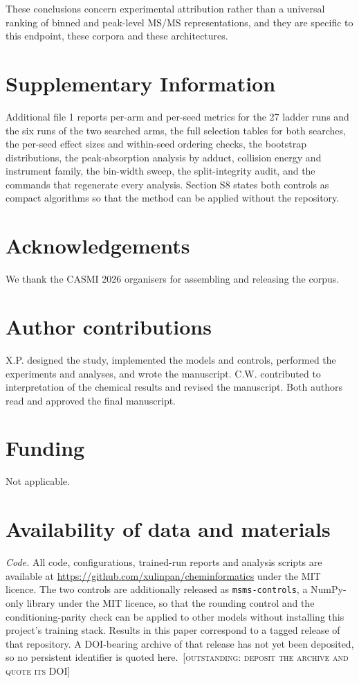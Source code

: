 \documentclass[11pt]{article}
\newif\ifdraftnotes\draftnotestrue
\newcommand{\todoarchive}{\ifdraftnotes\ \textcolor{ednotecol}{\small\textsc{[outstanding:
deposit the archive and quote its DOI]}}\fi}
\begin{document}
These conclusions concern experimental attribution rather than a universal ranking of
binned and peak-level MS/MS representations, and they are specific to this endpoint,
these corpora and these architectures.

\section*{Supplementary Information}
Additional file 1 reports per-arm and per-seed metrics for the 27 ladder runs and the six runs of the two searched arms, the full selection tables for both searches, the per-seed effect sizes and within-seed ordering checks, the bootstrap distributions, the peak-absorption analysis by adduct, collision energy and instrument family, the bin-width sweep, the split-integrity audit, and the commands that regenerate every analysis. Section S8 states both controls as compact algorithms so that the method can be applied without the repository.

\section*{Acknowledgements}
We thank the CASMI 2026 organisers for assembling and releasing the corpus.

\section*{Author contributions}
X.P. designed the study, implemented the models and controls, performed the experiments and analyses, and wrote the manuscript. C.W. contributed to interpretation of the chemical results and revised the manuscript. Both authors read and approved the final manuscript.

\section*{Funding}
Not applicable.

\section*{Availability of data and materials}
\sloppy
\emph{Code.} All code, configurations, trained-run reports and analysis scripts are available at \url{https://github.com/xulinpan/cheminformatics} under the MIT licence. The two controls are additionally released as \texttt{msms-controls}, a NumPy-only library under the MIT licence, so that the rounding control and the conditioning-parity check can be applied to other models without installing this project's training stack. Results in this paper correspond to a tagged release of that repository. A DOI-bearing archive of that release has not yet been deposited, so no persistent identifier is quoted here.\todoarchive
\end{document}
